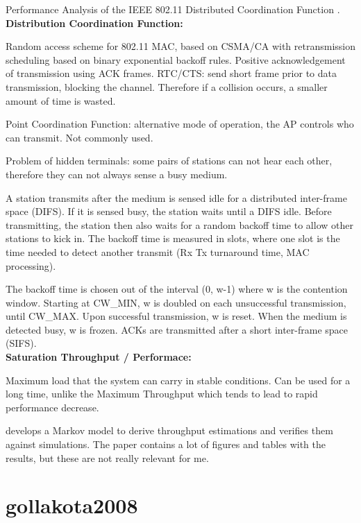 Performance Analysis of the IEEE 802.11 Distributed Coordination Function \cite{bianchi2000}.\\

\textbf{Distribution Coordination Function:}

Random access scheme for 802.11 MAC, based on CSMA/CA with retransmission scheduling based on binary exponential backoff rules. Positive acknowledgement of transmission using ACK frames. RTC/CTS: send short frame prior to data transmission, blocking the channel. Therefore if a collision occurs, a smaller amount of time is wasted.

Point Coordination Function: alternative mode of operation, the AP controls who can transmit. Not commonly used.

Problem of hidden terminals: some pairs of stations can not hear each other, therefore they can not always sense a busy medium.

A station transmits after the medium is sensed idle for a distributed inter-frame space (DIFS). If it is sensed busy, the station waits until a DIFS idle. Before transmitting, the station then also waits for a random backoff time to allow other stations to kick in. The backoff time is measured in slots, where one slot is the time needed to detect another transmit (Rx Tx turnaround time, MAC processing).

The backoff time is chosen out of the interval (0, w-1) where w is the contention window. Starting at CW\_MIN, w is doubled on each unsuccessful transmission, until CW\_MAX. Upon successful transmission, w is reset. When the medium is detected busy, w is frozen. ACKs are transmitted after a short inter-frame space (SIFS).\\

\textbf{Saturation Throughput / Performace:}

Maximum load that the system can carry in stable conditions. Can be used for a long time, unlike the Maximum Throughput which tends to lead to rapid performance decrease.

\cite{bianchi2000} develops a Markov model to derive throughput estimations and verifies them against simulations. The paper contains a lot of figures and tables with the results, but these are not really relevant for me.



\section{gollakota2008}

